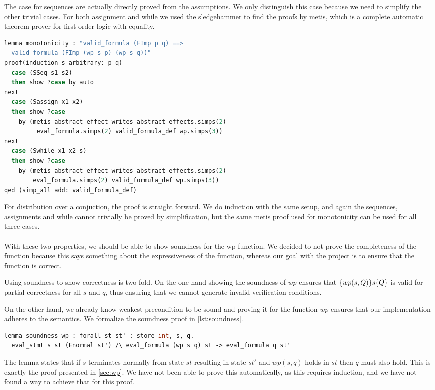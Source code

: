 The case for sequences are actually directly proved from the assumptions.
We only distinguish this case because we need to simplify the other trivial cases.
For both assignment and while we used the sledgehammer to find the proofs by metis,
which is a complete automatic theorem prover for first order logic with equality\cite{sledgehammer}.

\begin{lstlisting}[caption={Proof of monotonicity in Isabelle},label={lst:isamono},language=sml]
lemma monotonicity : "valid_formula (FImp p q) ==>
  valid_formula (FImp (wp s p) (wp s q))"
proof(induction s arbitrary: p q)
  case (SSeq s1 s2)
  then show ?case by auto
next
  case (Sassign x1 x2)
  then show ?case
    by (metis abstract_effect_writes abstract_effects.simps(2)
         eval_formula.simps(2) valid_formula_def wp.simps(3))
next
  case (Swhile x1 x2 s)
  then show ?case
    by (metis abstract_effect_writes abstract_effects.simps(2)
        eval_formula.simps(2) valid_formula_def wp.simps(3))
qed (simp_all add: valid_formula_def)
\end{lstlisting}

For distribution over a conjuction, the proof is straight forward.
We do induction with the same setup,
and again the sequences, assignments and while cannot trivially be proved by simplification,
but the same metis proof used for monotonicity can be used for all three cases.
\\~\\
With these two properties, we should be able to show soundness for the wp function.
We decided to not prove the completeness of the function because this says something about the expressiveness of the function, whereas our goal with the project is to ensure that
the function is correct.

Using soundness to show correctness is two-fold.
On the one hand showing the soundness of $wp$ ensures that $\{wp(s,Q)\}s\{Q\}$ is valid for
partial correctness for all $s$ and $q$, thus ensuring that we cannot generate invalid verification conditions.

On the other hand, we already know weakest precondition to be sound and proving it for the
function $wp$ ensures that our implementation adheres to the semantics.
We formalize the soundness proof in \autoref{lst:soundness}.

\begin{lstlisting}[caption={WLP soundness lemma in Why3},label={lst:soundness},language=sml]
  lemma soundness_wp : forall st st' : store int, s, q.
  eval_stmt s st (Enormal st') /\ eval_formula (wp s q) st -> eval_formula q st'
\end{lstlisting}

The lemma states that if $s$ terminates normally from state $st$ resulting in state $st'$ and $wp(s,q)$ holds in $st$ then $q$ must also hold.
This is exactly the proof presented in \ref{sec:wp}.
We have not been able to prove this automatically, as this requires induction, and we have
not found a way to achieve that for this proof.
